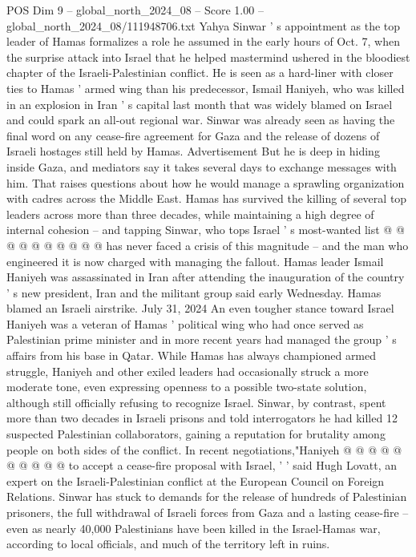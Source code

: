 \begin{textsample}{POS Dim 9 – global\_north\_2024\_08 – Score 1.00 – global\_north\_2024\_08/111948706.txt}  \label{ex:f9_pos_194}
Yahya Sinwar ' s appointment as the top leader of Hamas formalizes a role he assumed in the early hours of Oct. 7, when the surprise attack into Israel that he helped mastermind ushered in the bloodiest chapter of the Israeli-Palestinian conflict.
He is seen as a hard-liner with closer ties to Hamas ' armed wing than his predecessor, Ismail Haniyeh, who was killed in an explosion in Iran ' s capital last month that was widely blamed on Israel and could spark an all-out regional war.
Sinwar was already seen as having the final word on any cease-fire agreement for Gaza and the release of dozens of Israeli hostages still held by Hamas.
Advertisement But he is deep in hiding inside Gaza, and mediators say it takes several days to exchange messages with him.
That raises questions about how he would manage a sprawling organization with cadres across the Middle East.
Hamas has survived the killing of several top leaders across more than three decades, while maintaining a high degree of internal cohesion -- and tapping Sinwar, who tops Israel ' s most-wanted list @ @ @ @ @ @ @ @ @ @ has never faced a crisis of this magnitude -- and the man who engineered it is now charged with managing the fallout.
Hamas leader Ismail Haniyeh was assassinated in Iran after attending the inauguration of the country ' s new president, Iran and the militant group said early Wednesday.
Hamas blamed an Israeli airstrike.
July 31, 2024 An even tougher stance toward Israel Haniyeh was a veteran of Hamas ' political wing who had once served as Palestinian prime minister and in more recent years had managed the group ' s affairs from his base in Qatar.
While Hamas has always championed armed struggle, Haniyeh and other exiled leaders had occasionally struck a more moderate tone, even expressing openness to a possible two-state solution, although still officially refusing to recognize Israel.
Sinwar, by contrast, spent more than two decades in Israeli prisons and told interrogators he had killed 12 suspected Palestinian collaborators, gaining a reputation for brutality among people on both sides of the conflict.
In recent negotiations,"Haniyeh @ @ @ @ @ @ @ @ @ @ to accept a cease-fire proposal with Israel, ' ' said Hugh Lovatt, an expert on the Israeli-Palestinian conflict at the European Council on Foreign Relations.
Sinwar has stuck to demands for the release of hundreds of Palestinian prisoners, the full withdrawal of Israeli forces from Gaza and a lasting cease-fire -- even as nearly 40,000 Palestinians have been killed in the Israel-Hamas war, according to local officials, and much of the territory left in ruins.

\end{textsample}
